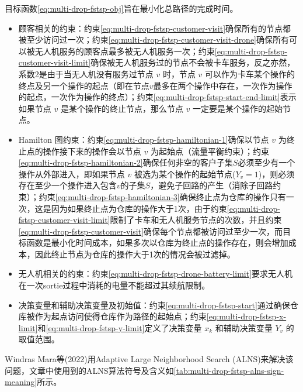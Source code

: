 目标函数\ref{eq:multi-drop-fstsp-obj}旨在最小化总路径的完成时间。

\begin{itemize}
    \item \colorbox{shallow-green}{顾客相关的约束：}约束\ref{eq:multi-drop-fstsp-customer-visit}确保所有的节点都被至少访问过一次；约束\ref{eq:multi-drop-fstsp-customer-visit-drone}确保所有可以被无人机服务的顾客点最多被无人机服务一次；约束\ref{eq:multi-drop-fstsp-customer-visit-limit}确保被无人机服务过的节点不会被卡车服务，反之亦然，系数2是由于当无人机没有服务过节点 $v$ 时，节点 $v$ 可以作为卡车某个操作的终点及另一个操作的起点（即在节点$v$最多在两个操作中存在，一次作为操作的起点，一次作为操作的终点）；约束\ref{eq:multi-drop-fstsp-start-end-limit}表示如果节点 $v$ 是某个操作的终止节点，那么节点 $v$ 一定要是某个操作的起始节点。 
    \item \colorbox{shallow-blue}{Hamilton 图\cite{HamiltonianPathWikiwand}约束：}约束\ref{eq:multi-drop-fstsp-hamiltonian-1}确保以节点 $v$ 为终止点的操作接下来的操作会以节点 $v$ 为起始点（流量平衡约束）；约束\ref{eq:multi-drop-fstsp-hamiltonian-2}确保任何非空的客户子集$S$必须至少有一个操作从外部进入，即如果节点 $v$ 被选为某个操作的起始节点($Y_v = 1$)，则必须存在至少一个操作进入包含$v$的子集$S$，避免子回路的产生（消除子回路约束）；约束\ref{eq:multi-drop-fstsp-hamiltonian-3}确保终止点为仓库的操作只有一次，这是因为如果终止点为仓库的操作大于1次，由于约束\ref{eq:multi-drop-fstsp-customer-visit-limit}限制了卡车和无人机服务节点的次数，并且约束\ref{eq:multi-drop-fstsp-customer-visit}确保每个节点都被访问过至少一次，而目标函数是最小化时间成本，如果多次以仓库为终止点的操作存在，则会增加成本，因此终止节点为仓库的操作大于1次的情况会被过滤掉。
    \item \colorbox{shallow-red}{无人机相关的约束：}约束\ref{eq:multi-drop-fstsp-drone-battery-limit}要求无人机在一次sortie过程中消耗的电量不能超过其续航限制。
    \item 决策变量和辅助决策变量及初始值：约束\ref{eq:multi-drop-fstsp-start}通过确保仓库被作为起点访问使得仓库作为路径的起始点；约束\ref{eq:multi-drop-fstsp-x-limit}和\ref{eq:multi-drop-fstsp-y-limit}定义了决策变量 $x_k$ 和辅助决策变量 $Y_v$ 的取值范围。 
\end{itemize}

Windras Mara等(2022)\cite{windrasmaraAdaptiveLargeNeighborhood2022}用Adaptive Large Neighborhood Search (ALNS)来解决该问题，文章中使用到的ALNS算法符号及含义如\ref{tab:multi-drop-fstsp-alns-sign-meaning}所示。

